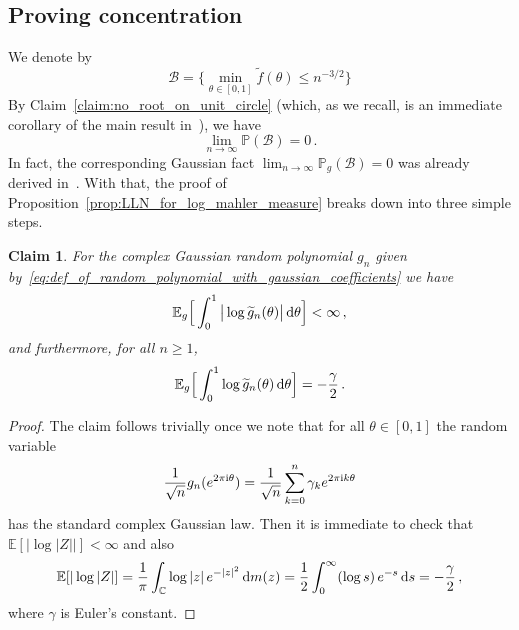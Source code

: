 \documentclass[11pt]{amsart}
\newtheorem{claim}[theorem]{Claim}
\theoremstyle{remark}
\theoremstyle{definition}
\newcommand{\bC}{\mathbb C}
\newcommand{\bP}{\mathbb P}
\newcommand{\bE}{\mathbb E}
\newcommand{\cB}{\mathcal B}
\newcommand{\I}{{\rm i}}
\begin{document}
    \subsection{Proving concentration}
    We denote by
    \begin{equation}
        \label{eq:def_of_event_B}
        \mathcal{B} = \Big\{ \min_{\theta\in[0,1]} \widetilde{f}(\theta) \le n^{-3/2}\Big\}
    \end{equation}
    By Claim~\ref{claim:no_root_on_unit_circle} (which, as we recall, is an immediate corollary of the main result in~\cite{Cook-Nguyen}), we have $$ \lim_{n\to\infty} \bP(\cB) =0 \, .$$ In fact, the corresponding Gaussian fact $\displaystyle \lim_{n\to\infty} \bP_g(\cB) =0 $ was already derived in~\cite{Konyagin-Schlag,Yakir-Zeitouni}. With that, the proof of Proposition~\ref{prop:LLN_for_log_mahler_measure} breaks down into three simple steps. 
    \begin{claim}
        \label{claim:computation_of_expected_gaussian_mahler_measure}
        For the complex Gaussian random polynomial $g_n$ given by~\eqref{eq:def_of_random_polynomial_with_gaussian_coefficients} we have
        \[
        \bE_g \Big[ \int_{0}^1 \big| \log \widetilde g_n(\theta) \big|  \, {\rm d} \theta \Big] < \infty \, ,
        \]
        and furthermore, for all $n\ge 1$,
        \[
         \bE_g \Big[ \int_{0}^1  \log \widetilde g_n(\theta)   \, {\rm d} \theta \Big] = -\frac{\gamma}{2} \, .
        \]
    \end{claim}
    
    \begin{proof}
        The claim follows trivially once we note that for all $\theta\in[0,1]$ the random variable
        \[
        \frac{1}{\sqrt{n}} g_n(e^{2\pi\I\theta}) = \frac{1}{\sqrt{n}} \sum_{k=0}^{n} \gamma_k e^{2\pi \I k\theta}
        \]
        has the standard complex Gaussian law. Then it is immediate to check that $\bE[\big|\log|Z|\big|] < \infty$ and also
        \[
        \bE[|\log|Z|]= \frac{1}{\pi} \int_{\bC} \log|z| \, e^{-|z|^2} \, {\rm d}m(z)  = \frac{1}{2}\int_0^\infty (\log s)\, e^{-s} \, {\rm d}s = -\frac{\gamma}{2} \, ,
        \]
        where $\gamma$ is Euler's constant. 
    \end{proof}
\end{document}
